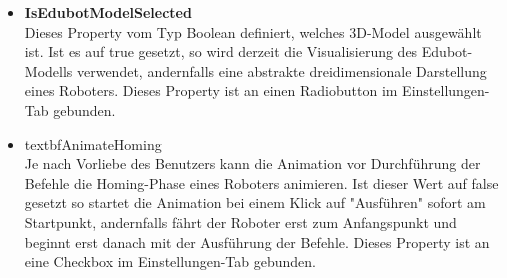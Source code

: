 \begin{itemize}
\item \textbf{IsEdubotModelSelected}\\
Dieses Property vom Typ Boolean definiert, welches 3D-Model ausgewählt ist. Ist es auf true gesetzt, so wird derzeit die Visualisierung des Edubot-Modells verwendet, andernfalls eine abstrakte dreidimensionale Darstellung eines Roboters. Dieses Property ist an einen Radiobutton im Einstellungen-Tab gebunden.
\item textbf{AnimateHoming}\\
Je nach Vorliebe des Benutzers kann die Animation vor Durchführung der Befehle die Homing-Phase eines Roboters animieren. Ist dieser Wert auf false gesetzt so startet die Animation bei einem Klick auf "Ausführen" sofort am Startpunkt, andernfalls fährt der Roboter erst zum Anfangspunkt und beginnt erst danach mit der Ausführung der Befehle. Dieses Property ist an eine Checkbox im Einstellungen-Tab gebunden.
\end{itemize}
